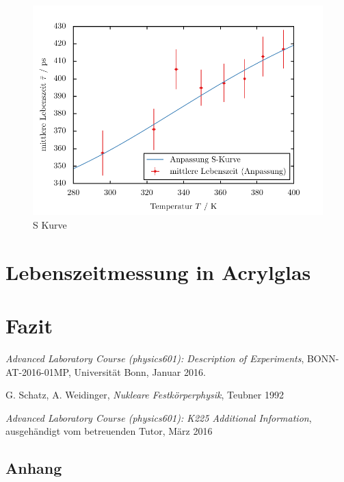 \documentclass[11pt, a4paper]{article}
\numberwithin{equation}{section}
\begin{document}
\begin{figure}[h]
	\centering
	\includegraphics{./figures/lifetime_s_curve.pdf}
	\caption{S Kurve}
\end{figure}


\section{Lebenszeitmessung in Acrylglas}

\section{Fazit}

\FloatBarrier
\vspace{\fill}
\begin{thebibliography}{19}
	\emph{Advanced Laboratory Course (physics601): Description of Experiments},
	BONN-AT-2016-01MP, Universität Bonn, Januar 2016.
	
	G. Schatz, A. Weidinger, \emph{Nukleare Festkörperphysik}, Teubner 1992
	
	\emph{Advanced Laboratory Course (physics601): K225 Additional Information},
	ausgehändigt vom betreuenden Tutor, März 2016
\end{thebibliography}

\begin{appendix}
\newpage
\section{Anhang}


\end{appendix}
\end{document}
